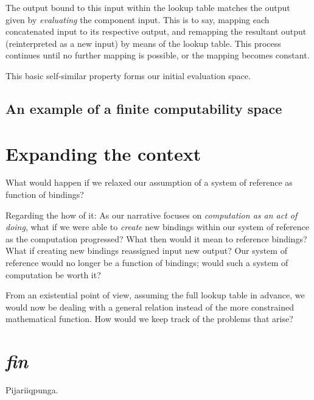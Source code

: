 \documentclass[twoside]{article}
\begin{document}
The output bound to this input within the lookup table matches the output given by \emph{evaluating} the component input.
This is to say, mapping each concatenated input to its respective output, and remapping the resultant output (reinterpreted
as a new input) by means of the lookup table. This process continues until no further mapping is possible, or the mapping
becomes constant.

This basic self-similar property forms our initial evaluation space.

\subsection*{An example of a finite computability space}

\section*{Expanding the context}

What would happen if we relaxed our assumption of a system of reference as function of bindings?

Regarding the how of it: As our narrative focuses on \emph{computation as an act of doing}, what if we were able to \emph{create}
new bindings within our system of reference as the computation progressed? What then would it mean to reference bindings? What if
creating new bindings reassigned input new output? Our system of reference would no longer be a function of bindings; would such
a system of computation be worth it?

From an existential point of view, assuming the full lookup table in advance, we would now be dealing with a general relation instead
of the more constrained mathematical function.  How would we keep track of the problems that arise?

\section*{\emph{fin}}

Pijariiqpunga.
\end{document}
